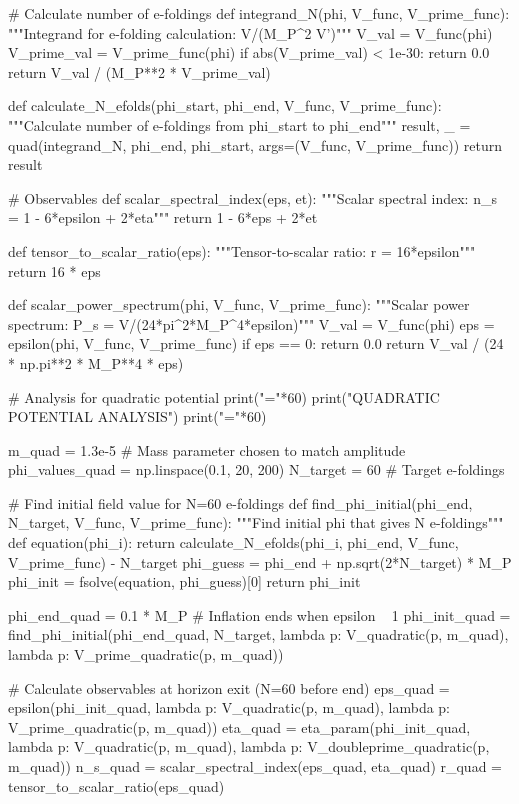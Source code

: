 \documentclass[a4paper, 11pt]{article}
\begin{document}
\begin{pycode}
# Calculate number of e-foldings
def integrand_N(phi, V_func, V_prime_func):
    """Integrand for e-folding calculation: V/(M_P^2 V')"""
    V_val = V_func(phi)
    V_prime_val = V_prime_func(phi)
    if abs(V_prime_val) < 1e-30:
        return 0.0
    return V_val / (M_P**2 * V_prime_val)

def calculate_N_efolds(phi_start, phi_end, V_func, V_prime_func):
    """Calculate number of e-foldings from phi_start to phi_end"""
    result, _ = quad(integrand_N, phi_end, phi_start, args=(V_func, V_prime_func))
    return result

# Observables
def scalar_spectral_index(eps, et):
    """Scalar spectral index: n_s = 1 - 6*epsilon + 2*eta"""
    return 1 - 6*eps + 2*et

def tensor_to_scalar_ratio(eps):
    """Tensor-to-scalar ratio: r = 16*epsilon"""
    return 16 * eps

def scalar_power_spectrum(phi, V_func, V_prime_func):
    """Scalar power spectrum: P_s = V/(24*pi^2*M_P^4*epsilon)"""
    V_val = V_func(phi)
    eps = epsilon(phi, V_func, V_prime_func)
    if eps == 0:
        return 0.0
    return V_val / (24 * np.pi**2 * M_P**4 * eps)

# Analysis for quadratic potential
print("="*60)
print("QUADRATIC POTENTIAL ANALYSIS")
print("="*60)

m_quad = 1.3e-5  # Mass parameter chosen to match amplitude
phi_values_quad = np.linspace(0.1, 20, 200)
N_target = 60  # Target e-foldings

# Find initial field value for N=60 e-foldings
def find_phi_initial(phi_end, N_target, V_func, V_prime_func):
    """Find initial phi that gives N e-foldings"""
    def equation(phi_i):
        return calculate_N_efolds(phi_i, phi_end, V_func, V_prime_func) - N_target
    phi_guess = phi_end + np.sqrt(2*N_target) * M_P
    phi_init = fsolve(equation, phi_guess)[0]
    return phi_init

phi_end_quad = 0.1 * M_P  # Inflation ends when epsilon ~ 1
phi_init_quad = find_phi_initial(phi_end_quad, N_target,
                                  lambda p: V_quadratic(p, m_quad),
                                  lambda p: V_prime_quadratic(p, m_quad))

# Calculate observables at horizon exit (N=60 before end)
eps_quad = epsilon(phi_init_quad,
                   lambda p: V_quadratic(p, m_quad),
                   lambda p: V_prime_quadratic(p, m_quad))
eta_quad = eta_param(phi_init_quad,
                      lambda p: V_quadratic(p, m_quad),
                      lambda p: V_doubleprime_quadratic(p, m_quad))
n_s_quad = scalar_spectral_index(eps_quad, eta_quad)
r_quad = tensor_to_scalar_ratio(eps_quad)


\end{pycode}
\end{document}
